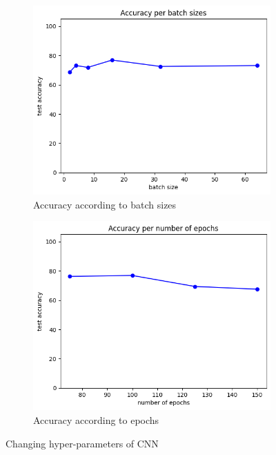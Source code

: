 \begin{figure}[htbp]
	\begin{subfigure}{0.48\linewidth}
		\centering
		\includegraphics[width=\linewidth]{image/q4-7-batch.png}
		\caption{Accuracy according to batch sizes}
		\label{fig:q4-7-batch}
	\end{subfigure}
	\hfill
	\begin{subfigure}{0.48\linewidth}
		\centering
		\includegraphics[width=\linewidth]{image/q4-7-epoch.png}
		\caption{Accuracy according to epochs}
		\label{fig:q4-7-epoch}
	\end{subfigure}
	\caption{Changing hyper-parameters of CNN}
	\label{fig:q2}
\end{figure}

